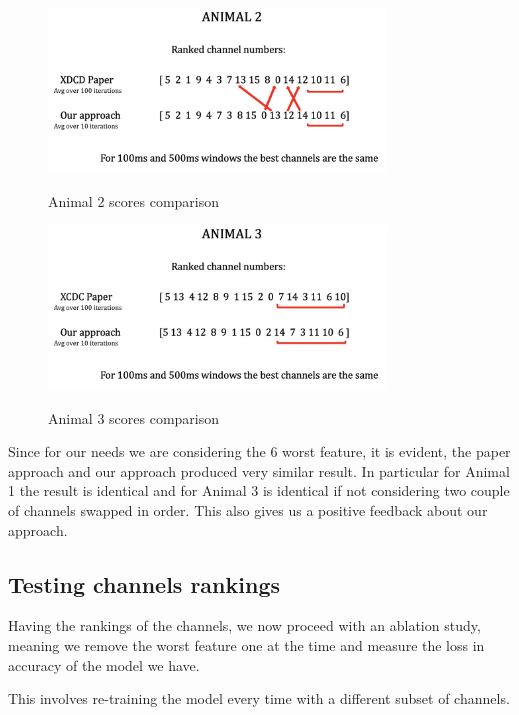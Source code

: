\documentclass{Configuration_Files/PoliMi3i_thesis}
\begin{document}
\begin{figure}[H]
    \centering
    \includegraphics[width=0.8\textwidth]{Results Matteo/Screenshot 2024-08-18 at 18.54.28.png}
    \label{figure_ex2}
    \caption{Animal 2 scores comparison}
\end{figure}

\begin{figure}[H]
    \centering
    \includegraphics[width=0.8\textwidth]{Results Matteo/Screenshot 2024-08-18 at 18.54.30.png}
    \label{figure_ex3}
    \caption{Animal 3 scores comparison}
\end{figure}

Since for our needs we are considering the 6 worst feature, it is evident, the paper approach and our approach produced very similar result.
In particular for Animal 1 the result is identical and for Animal 3 is identical if not considering two couple of channels swapped in order.
This also gives us a positive feedback about our approach.

\subsection{Testing channels rankings}

Having the rankings of the channels, we now proceed with an ablation study, meaning we remove the worst feature one at the time and measure the loss in accuracy of the model we have.

This involves re-training the model every time with a different subset of channels.
\end{document}
